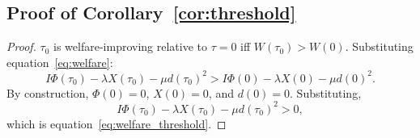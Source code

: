 \subsection{Proof of Corollary~\ref{cor:threshold}}
\label{ssec:proof_threshold}

\begin{proof}
$\tau_0$ is welfare-improving relative to $\tau = 0$ iff $W(\tau_0) > W(0)$. Substituting equation~\eqref{eq:welfare}:
\[
I \Phi(\tau_0) - \lambda X(\tau_0) - \mu d(\tau_0)^2 > I \Phi(0) - \lambda X(0) - \mu d(0)^2.
\]
By construction, $\Phi(0) = 0$, $X(0) = 0$, and $d(0) = 0$. Substituting,
\[
I \Phi(\tau_0) - \lambda X(\tau_0) - \mu d(\tau_0)^2 > 0,
\]
which is equation~\eqref{eq:welfare_threshold}.
\end{proof}
